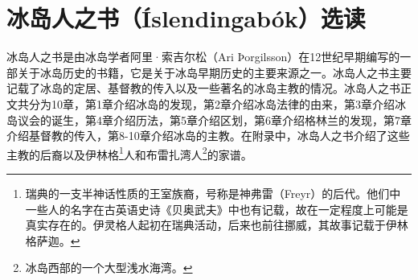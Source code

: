 \section{冰岛人之书（Íslendingabók）选读}
冰岛人之书是由冰岛学者阿里·索吉尔松（Ari Þorgilsson）在12世纪早期编写的一部关于冰岛历史的书籍，它是关于冰岛早期历史的主要来源之一。冰岛人之书主要记载了冰岛的定居、基督教的传入以及一些著名的冰岛主教的情况。冰岛人之书正文共分为10章，第1章介绍冰岛的发现，第2章介绍冰岛法律的由来，第3章介绍冰岛议会的诞生，第4章介绍历法，第5章介绍区划，第6章介绍格林兰的发现，第7章介绍基督教的传入，第8-10章介绍冰岛的主教。在附录中，冰岛人之书介绍了这些主教的后裔以及伊林格\footnote{瑞典的一支半神话性质的王室族裔，号称是神弗雷（Freyr）的后代。他们中一些人的名字在古英语史诗《贝奥武夫》中也有记载，故在一定程度上可能是真实存在的。伊灵格人起初在瑞典活动，后来也前往挪威，其故事记载于伊林格萨迦。}人和布雷扎湾人\footnote{冰岛西部的一个大型浅水海湾。}的家谱。

